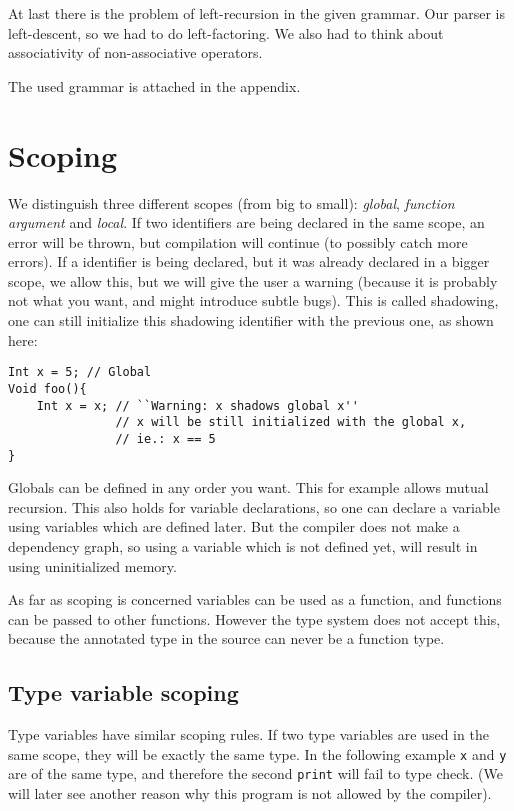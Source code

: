 \documentclass[11pt]{amsart}
\begin{document}
At last there is the problem of left-recursion in the given grammar. Our parser is left-descent, so we had to do left-factoring. We also had to think about associativity of non-associative operators.

The used grammar is attached in the appendix.

\section{Scoping}
We distinguish three different scopes (from big to small): \emph{global}, \emph{function argument} and \emph{local}. If two identifiers are being declared in the same scope, an error will be thrown, but compilation will continue (to possibly catch more errors). If a identifier is being declared, but it was already declared in a bigger scope, we allow this, but we will give the user a warning (because it is probably not what you want, and might introduce subtle bugs). This is called shadowing, one can still initialize this shadowing identifier with the previous one, as shown here:

\begin{lstlisting}[language=spl]
Int x = 5; // Global
Void foo(){
    Int x = x; // ``Warning: x shadows global x''
               // x will be still initialized with the global x,
               // ie.: x == 5
}
\end{lstlisting}

Globals can be defined in any order you want. This for example allows mutual recursion. This also holds for variable declarations, so one can declare a variable using variables which are defined later. But the compiler does not make a dependency graph, so using a variable which is not defined yet, will result in using uninitialized memory.

As far as scoping is concerned variables can be used as a function, and functions can be passed to other functions. However the type system does not accept this, because the annotated type in the source can never be a function type.

\subsection{Type variable scoping}
Type variables have similar scoping rules. If two type variables are used in the same scope, they will be exactly the same type. In the following example \texttt{x} and \texttt{y} are of the same type, and therefore the second \texttt{print} will fail to type check. (We will later see another reason why this program is not allowed by the compiler).
\end{document}
